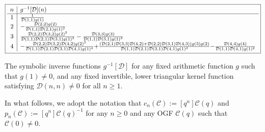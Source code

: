 \documentclass[12pt,reqno,a4letter]{article}
\numberwithin{figure}{section}
\numberwithin{table}{section}
\numberwithin{equation}{section}
\theoremstyle{plain}
\numberwithin{theorem}{section}
\theoremstyle{definition}
\begin{document}
\begin{table}[h!]
\begin{center}
\begin{equation*}
\boxed{
\begin{array}{c|l}
 n & g^{-1}[\mathcal{D}](n) \\ \hline 
 1 & \frac{1}{\mathcal{D}(1,1) g(1)} \\
 2 & -\frac{\mathcal{D}(2,2) g(2)}{\mathcal{D}(1,1) \mathcal{D}(2,1) g(1)^2} \\
 3 & \frac{\mathcal{D}(2,2) \mathcal{D}(3,2) g(2)^2}{\mathcal{D}(1,1) \mathcal{D}(2,1) 
     \mathcal{D}(3,1) g(1)^3}-\frac{\mathcal{D}(3,3)
     g(3)}{\mathcal{D}(1,1) \mathcal{D}(3,1) g(1)^2} \\
 4 & \scriptsize{-}\frac{\mathcal{D}(2,2) \mathcal{D}(3,2) \mathcal{D}(4,2) g(2)^3}{\mathcal{D}(1,1) 
     \mathcal{D}(2,1) \mathcal{D}(3,1) \mathcal{D}(4,1)
	g(1)^4}\tiny{+}\frac{(\mathcal{D}(2,1) \mathcal{D}(3,3) \mathcal{D}(4,2)+\mathcal{D}(2,2) \mathcal{D}(3,1) 
     \mathcal{D}(4,3)) g(3) g(2)}{\mathcal{D}(1,1)
     \mathcal{D}(2,1) \mathcal{D}(3,1) \mathcal{D}(4,1) g(1)^3}\tiny{-}\frac{\mathcal{D}(4,4) g(4)}{\mathcal{D}(1,1) 
     \mathcal{D}(4,1) g(1)^2} \\
\end{array}
}
\end{equation*}
\end{center}

\caption[Symbolic computations of the inverse functions for D-convolutions]{
	 The symbolic inverse functions $g^{-1}[\mathcal{D}]$ 
         for any fixed arithmetic function $g$ such that 
         $g(1) \neq 0$, and any fixed invertible, lower 
         triangular kernel function satisfying $\mathcal{D}(n, n) \neq 0$ for all $n \geq 1$. }

\end{table}

In what follows, we adopt the notation that 
$c_n(\mathcal{C}) := [q^n] \mathcal{C}(q)$ and 
$p_n(\mathcal{C}) := [q^n] \mathcal{C}(q)^{-1}$ for any $n \geq 0$ and any OGF 
$\mathcal{C}(q)$ such that $\mathcal{C}(0) \neq 0$. 
\end{document}
